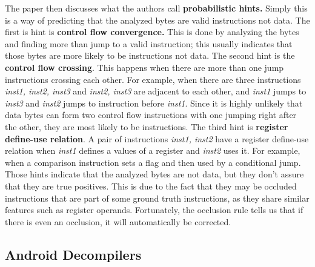 \documentclass{article}
\begin{document}
\noindent The paper then discusses what the authors call \textbf{probabilistic hints.} Simply this is a way of predicting that the analyzed bytes are valid instructions not data. The first is hint is \textbf{control flow convergence.} This is done by analyzing the bytes and finding more than jump to a valid instruction; this usually indicates that those bytes are more likely to be instructions not data. The second hint is the \textbf{control flow crossing}. This happens when there are more than one jump instructions crossing each other. For example, when there are three instructions \emph{inst1, inst2, inst3} and \emph{inst2, inst3} are adjacent to each other, and \emph{inst1} jumps to \emph{inst3} and \emph{inst2} jumps to instruction before \emph{inst1}. Since it is highly unlikely that data bytes can form two control flow instructions with one jumping right after the other, they are most likely to be instructions. The third hint is \textbf{register define-use relation}. A pair of instructions \emph{inst1, inst2} have a register define-use relation when \emph{inst1} defines a values of a register and \emph{inst2} uses it. For example, when a comparison instruction sets a flag and then used by a conditional jump. Those hints indicate that the analyzed bytes are not data, but they don't assure that they are true positives. This is due to the fact that they may be occluded instructions that are part of some ground truth instructions, as they share similar features such as register operands. Fortunately, the occlusion rule tells us that if there is even an occlusion, it will automatically be corrected.

\subsection{Android Decompilers}
\end{document}
